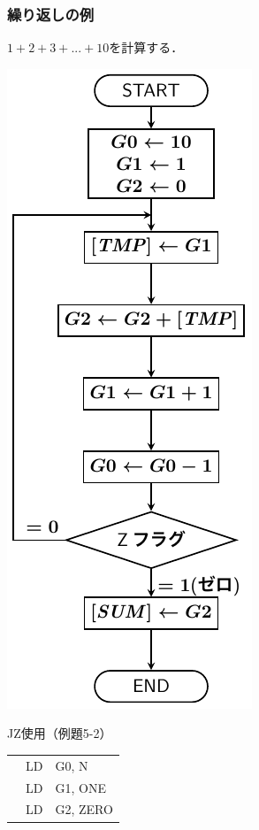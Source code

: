 \documentclass[handout]{beamer}        %
\begin{document}
\begin{frame}
  \frametitle{繰り返しの例}
  $1 + 2 + 3 + ... + 10$を計算する．\\
  \vfill
  \begin{minipage}{0.26\columnwidth}
    \centerline{\includegraphics[scale=0.55]{../Tikz/flow3A.pdf}}
  \end{minipage}
  \begin{minipage}{0.36\columnwidth}
    {\ttfamily JZ使用（例題5-2）\\\scriptsize
      \begin{tabular}{|l|l|l|}
              & LD     & G0, N    \\
              & LD     & G1, ONE  \\
              & LD     & G2, ZERO \\

\end{tabular}}
\end{minipage}
\end{frame}
\end{document}
